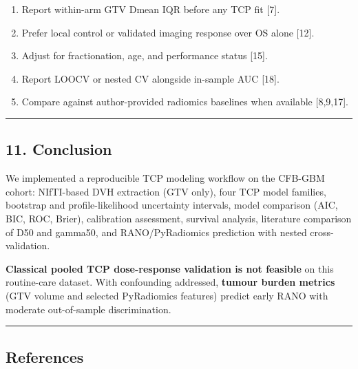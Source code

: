 \documentclass[
  11pt,
]{article}
\providecommand{\tightlist}{%
  \setlength{\itemsep}{0pt}\setlength{\parskip}{0pt}}
\begin{document}
\begin{enumerate}
\def\labelenumi{\arabic{enumi}.}
\tightlist
\item
  Report within-arm GTV Dmean IQR before any TCP fit {[}7{]}.
\item
  Prefer local control or validated imaging response over OS alone
  {[}12{]}.
\item
  Adjust for fractionation, age, and performance status {[}15{]}.
\item
  Report LOOCV or nested CV alongside in-sample AUC {[}18{]}.
\item
  Compare against author-provided radiomics baselines when available
  {[}8,9,17{]}.
\end{enumerate}

\begin{center}\rule{0.5\linewidth}{0.5pt}\end{center}

\subsection{11. Conclusion}\label{conclusion}

We implemented a reproducible TCP modeling workflow on the CFB-GBM
cohort: NIfTI-based DVH extraction (GTV only), four TCP model families,
bootstrap and profile-likelihood uncertainty intervals, model comparison
(AIC, BIC, ROC, Brier), calibration assessment, survival analysis,
literature comparison of D50 and gamma50, and RANO/PyRadiomics
prediction with nested cross-validation.

\textbf{Classical pooled TCP dose-response validation is not feasible}
on this routine-care dataset. With confounding addressed, \textbf{tumour
burden metrics} (GTV volume and selected PyRadiomics features) predict
early RANO with moderate out-of-sample discrimination.

\begin{center}\rule{0.5\linewidth}{0.5pt}\end{center}

\subsection{References}\label{references}
\end{document}
